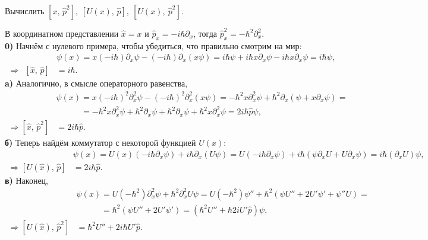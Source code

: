 
\begin{leftrules}
Вычислить $[x,\, \hat{p}^2],\ [U(x),\, \hat{p}],\ [U(x),\ \hat{p}^2]$.
\end{leftrules}


В координатном представлении $\hat{x} = x$ и $\hat{p}_x = - i \hbar \partial_x$, тогда $\hat{p}_x^2 = - \hbar^2 \partial_x^{2}$. 
\\
\textbf{0)} Начнём с нулевого примера, чтобы убедиться, что правильно смотрим на мир:
\begin{align*}
    [\hat{x},\, \hat{p}] &\psi(x) = 
    x (-i \hbar) \partial_x \psi - (-i \hbar) \partial_x (x \psi) = i \hbar \psi + i \hbar x \partial_x \psi - i \hbar x \partial_x \psi = i \hbar \psi,  \\ 
    \Rightarrow \ \ [\hat{x},\, \hat{p}] &= i \hbar.
\end{align*}
\textbf{a)} Аналогично, в смысле операторного равенства,
\begin{align*}
    [\hat{x},\, \hat{p}^2] &\psi(x) 
    = 
    x (-i \hbar)^2 \partial_x^2 \psi - (-i \hbar)^2 \partial_x^2 (x \psi) 
    = 
    - \hbar^2 x \partial_x^2 \psi + \hbar^2 \partial_x (\psi + x \partial_x \psi) 
    = \\ &\phantom{\psi(x)}= 
    - \hbar^2 x \partial_x^2 \psi + \hbar^2 \partial_x \psi + \hbar^2 \partial_x \psi + \hbar^2 x \partial_x^2 \psi = 2 i \hbar \hat{p} \psi,
    \\ \Rightarrow [\hat{x},\, \hat{p}^2] &= 2 i \hbar \hat{p}.
\end{align*}
\textbf{б)} Теперь найдём коммутатор с некоторой функцией $U(x)$:
\begin{align*}
    [U(\hat{x}),\, \hat{p}]&\psi(x) 
    = 
    U(x) (- i \hbar \partial_x \psi) + i \hbar \partial_x (U \psi) 
    = 
    U (- i \hbar \partial_x \psi) + i \hbar  (\psi \partial_x U + U \partial_x \psi)
    = 
    i \hbar (\partial_x U) \psi,
    \\ \Rightarrow [U(\hat{x}),\, \hat{p}] &= 2 i \hbar \hat{p}.
\end{align*}
\textbf{в)} Наконец, 
\begin{align*}
    [U(\hat{x}),\, \hat{p}^2]&\psi(x) 
    = 
    U (-\hbar^2) \partial_x^2 \psi + \hbar^2 \partial_x^2 U \psi
    =
    U (- \hbar^2) \psi'' + \hbar^2 (\psi U'' + 2 U' \psi' + \psi'' U) 
    = \\ &\phantom{\psi(x)}= 
    \hbar^2 (\psi U'' + 2 U' \psi') 
    =
    (\hbar^2 U'' + \hbar 2i U' \hat{p} )\psi,
    \\ \Rightarrow [U(\hat{x}),\, \hat{p}^2] &= \hbar^2 U'' + 2 i \hbar U' \hat{p}.
\end{align*}